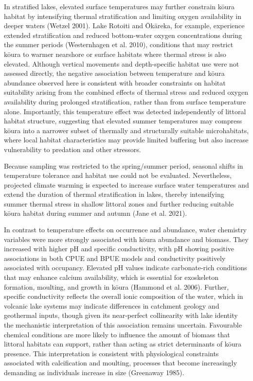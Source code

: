 \documentclass[
  12pt,
  a4paper,
  oneside]{scrbook}
\begin{document}
In stratified lakes, elevated surface temperatures may further constrain
kōura habitat by intensifying thermal stratification and limiting oxygen
availability in deeper waters (Wetzel 2001). Lake Rotoiti and Ōkāreka,
for example, experience extended stratification and reduced bottom-water
oxygen concentrations during the summer periods (Westernhagen et al.
2010), conditions that may restrict kōura to warmer nearshore or surface
habitats where thermal stress is also elevated. Although vertical
movements and depth-specific habitat use were not assessed directly, the
negative association between temperature and kōura abundance observed
here is consistent with broader constraints on habitat suitability
arising from the combined effects of thermal stress and reduced oxygen
availability during prolonged stratification, rather than from surface
temperature alone. Importantly, this temperature effect was detected
independently of littoral habitat structure, suggesting that elevated
summer temperatures may compress kōura into a narrower subset of
thermally and structurally suitable microhabitats, where local habitat
characteristics may provide limited buffering but also increase
vulnerability to predation and other stressors.

Because sampling was restricted to the spring/summer period, seasonal
shifts in temperature tolerance and habitat use could not be evaluated.
Nevertheless, projected climate warming is expected to increase surface
water temperatures and extend the duration of thermal stratification in
lakes, thereby intensifying summer thermal stress in shallow littoral
zones and further reducing suitable kōura habitat during summer and
autumn ({Jane et al.} 2021).

In contrast to temperature effects on occurrence and abundance, water
chemistry variables were more strongly associated with kōura abundance
and biomass. They increased with higher pH and specific conductivity,
with pH showing positive associations in both CPUE and BPUE models and
conductivity positively associated with occupancy. Elevated pH values
indicate carbonate-rich conditions that may enhance calcium
availability, which is essential for exoskeleton formation, moulting,
and growth in kōura (Hammond et al. 2006). Further, specific
conductivity reflects the overall ionic composition of the water, which
in volcanic lake systems may indicate differences in catchment geology
and geothermal inputs, though given its near-perfect collinearity with
lake identity the mechanistic interpretation of this association remains
uncertain. Favourable chemical conditions are more likely to influence
the amount of biomass that littoral habitats can support, rather than
acting as strict determinants of kōura presence. This interpretation is
consistent with physiological constraints associated with calcification
and moulting, processes that become increasingly demanding as
individuals increase in size (Greenaway 1985).
\end{document}
